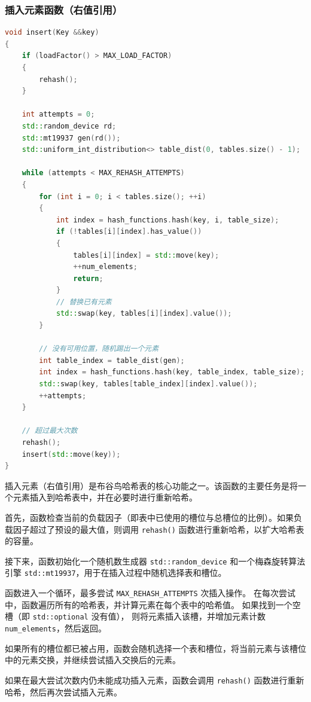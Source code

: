 \documentclass[UTF8]{ctexart}
\begin{document}
\subsubsection{插入元素函数（右值引用）}
\begin{lstlisting}[language=C++]
void insert(Key &&key)
{
    if (loadFactor() > MAX_LOAD_FACTOR)
    {
        rehash();
    }

    int attempts = 0;
    std::random_device rd;
    std::mt19937 gen(rd());
    std::uniform_int_distribution<> table_dist(0, tables.size() - 1);

    while (attempts < MAX_REHASH_ATTEMPTS)
    {
        for (int i = 0; i < tables.size(); ++i)
        {
            int index = hash_functions.hash(key, i, table_size);
            if (!tables[i][index].has_value())
            {
                tables[i][index] = std::move(key);
                ++num_elements;
                return;
            }
            // 替换已有元素
            std::swap(key, tables[i][index].value());
        }

        // 没有可用位置，随机踢出一个元素
        int table_index = table_dist(gen);
        int index = hash_functions.hash(key, table_index, table_size);
        std::swap(key, tables[table_index][index].value());
        ++attempts;
    }

    // 超过最大次数
    rehash();
    insert(std::move(key));
}
\end{lstlisting}
插入元素（右值引用）是布谷鸟哈希表的核心功能之一。该函数的主要任务是将一个元素插入到哈希表中，并在必要时进行重新哈希。

首先，函数检查当前的负载因子（即表中已使用的槽位与总槽位的比例）。如果负载因子超过了预设的最大值，则调用 \texttt{rehash()} 函数进行重新哈希，以扩大哈希表的容量。

接下来，函数初始化一个随机数生成器 \texttt{std::random\_device} 和一个梅森旋转算法引擎 \texttt{std::mt19937}，用于在插入过程中随机选择表和槽位。

函数进入一个循环，最多尝试 \texttt{MAX\_REHASH\_ATTEMPTS} 次插入操作。
在每次尝试中，函数遍历所有的哈希表，并计算元素在每个表中的哈希值。
如果找到一个空槽（即 \texttt{std::optional} 没有值），
则将元素插入该槽，并增加元素计数 \texttt{num\_elements}，然后返回。

如果所有的槽位都已被占用，函数会随机选择一个表和槽位，将当前元素与该槽位中的元素交换，并继续尝试插入交换后的元素。

如果在最大尝试次数内仍未能成功插入元素，函数会调用 \texttt{rehash()} 函数进行重新哈希，然后再次尝试插入元素。
\end{document}
